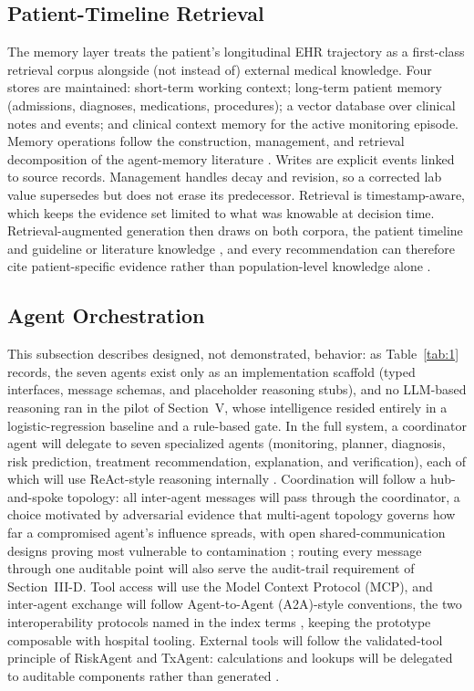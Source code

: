 \subsection{Patient-Timeline Retrieval}

The memory layer treats the patient's longitudinal EHR trajectory as a first-class retrieval
corpus alongside (not instead of) external medical knowledge. Four stores are maintained:
short-term working context; long-term patient memory (admissions, diagnoses, medications,
procedures); a vector database over clinical notes and events; and clinical context memory for
the active monitoring episode. Memory operations follow the construction, management, and
retrieval decomposition of the agent-memory literature \cite{wu2025memory}. Writes are explicit
events linked to source records. Management handles decay and revision, so a corrected lab
value supersedes but does not erase its predecessor. Retrieval is timestamp-aware, which keeps
the evidence set limited to what was knowable at decision time. Retrieval-augmented generation
then draws on both corpora, the patient timeline and guideline or literature knowledge
\cite{lewis2020rag,singh2025agenticrag}, and every recommendation can therefore cite
patient-specific evidence rather than population-level knowledge alone
\cite{zhao2025medrag,ke2025ragfitness}.

\subsection{Agent Orchestration}

This subsection describes designed, not demonstrated, behavior: as Table~\ref{tab:1} records, the
seven agents exist only as an implementation scaffold (typed interfaces, message schemas,
and placeholder reasoning stubs), and no LLM-based reasoning ran in the pilot of Section~V,
whose intelligence resided entirely in a logistic-regression baseline and a rule-based gate.
In the full system, a coordinator agent will delegate to seven specialized agents
(monitoring, planner, diagnosis, risk prediction, treatment recommendation, explanation, and
verification), each of which will use ReAct-style reasoning internally \cite{yao2023react}.
Coordination will follow a hub-and-spoke topology: all inter-agent messages will pass
through the coordinator, a choice motivated by adversarial evidence that multi-agent
topology governs how far a compromised agent's influence spreads, with open
shared-communication designs proving most vulnerable to contamination \cite{chen2025medsentry};
routing every message through one auditable point will also serve the audit-trail
requirement of Section~III-D. Tool access will use the Model Context Protocol (MCP), and
inter-agent exchange will follow Agent-to-Agent (A2A)-style conventions, the two
interoperability protocols named in the index terms \cite{ehtesham2025protocols}, keeping the
prototype composable with hospital tooling. External tools will follow the validated-tool
principle of RiskAgent and TxAgent: calculations and lookups will be delegated to auditable
components rather than generated \cite{liu2025riskagent,gao2025txagent}.


